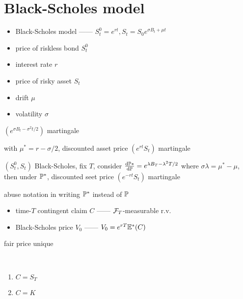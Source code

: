 \section{Black-Scholes model}\label{sec:black-scholes-model}

\begin{itemize}
    \item Black-Scholes model ------ $S_t^0 = e^{rt}, S_t = S_0 e^{\sigma B_t + \mu t}$
    \item price of riskless bond $S_t^0$
    \item interest rate $r$
    \item price of risky asset $S_t$
    \item drift $\mu$
    \item volatility $\sigma$
\end{itemize}

\begin{fact}
    $(e^{\sigma B_t - \sigma^2 t/2})$ martingale
\end{fact}

\begin{fact}
    with $\mu^* = r - \sigma/2$, discounted asset price $(e^{rt}S_t)$ martingale
\end{fact}

\begin{prop}
    $(S_t^0, S_t)$ Black-Scholes, fix $T$, consider $\dv{\mathbb{P}*}{\mathbb{P}} = e^{\lambda B_T - \lambda^{2}T/2}$ where $\sigma \lambda = \mu^* - \mu$, then
    under $\mathbb{P}^*$, discounted seet price $(e^{-rt}S_t)$ martingale
\end{prop}

\begin{fact}
    abuse notation in writing $\mathbb{P}^*$ instead of $\mathbb{P}$
\end{fact}

\begin{itemize}
    \item time-$T$ contingent claim $C$ ------ $\mathcal{F}_T$-measurable r.v.
    \item Black-Scholes price $V_0$ ------ $V_0 = e^{rT}\mathbb{E}^*(C)$
\end{itemize}

\begin{fact}
    fair price unique
\end{fact}

\begin{example}\,
    \begin{enumerate}
        \item $C = S_T$
        \item $C = K$
    \end{enumerate}
\end{example}

